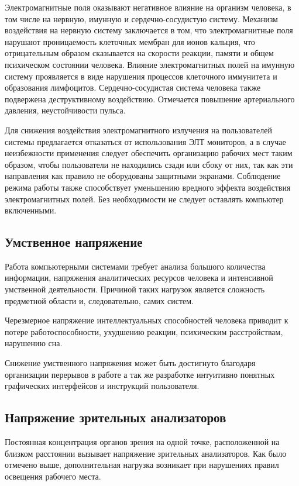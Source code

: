 \documentclass[14pt,oneside,final]{extreport}
\begin{document}
	Электромагнитные поля оказывают негативное влияние на организм  человека, в том числе на нервную, имунную и сердечно-сосудистую систему. Механизм воздействия на нервную систему заключается в том, что электромагнитные поля нарушают проницаемость клеточных мембран для ионов кальция, что отрицательным образом сказывается на скорости реакции, памяти и общем психическом состоянии человека. Влияние электромагнитных полей на имунную систему проявляется в виде нарушения процессов клеточного иммунитета и образования лимфоцитов. Сердечно-сосудистая система человека также подвержена деструктивному воздействию. Отмечается повышение артериального давления, неустойчивости пульса.   
	
	Для снижения воздействия электромагнитного излучения на пользователей системы предлагается отказаться от использования ЭЛТ мониторов, а в случае неизбежности применения следует обеспечить организацию рабочих мест таким образом, чтобы пользователи не находились сзади или сбоку от них, так как эти направления как правило не оборудованы защитными экранами. Соблюдение режима работы также способствует уменьшению вредного эффекта воздействия электромагнитных полей. Без необходимости не следует оставлять компьютер включенными.   
	\subsection{Умственное напряжение}
	Работа компьютерными системами требует анализа большого количества информации, напряжения аналитических ресурсов человека и интенсивной умственной деятельности. Причиной таких нагрузок является сложность предметной области и, следовательно, самих систем.   
	
	Черезмерное напряжение интеллектуальных способностей человека приводит к потере работоспособности, ухудшению реакции, психическим расстройствам, нарушению сна. 
	
	Снижение умственного напряжения может быть достигнуто благодаря организации перерывов в работе а так же разработке интуитивно понятных графических интерфейсов и инструкций пользователя.  
	\subsection{Напряжение зрительных анализаторов}
	Постоянная концентрация органов зрения на одной точке, расположенной на близком расстоянии вызывает напряжение зрительных анализаторов. Как было отмечено выше, дополнительная нагрузка возникает при нарушениях правил освещения рабочего места. 
	
\end{document}

